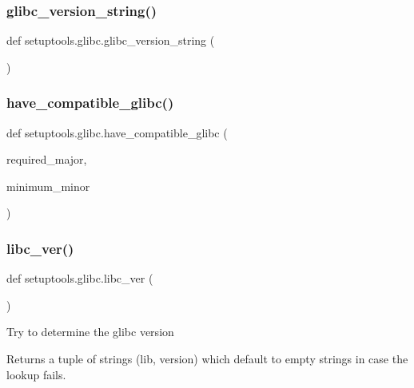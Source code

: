 \mbox{\label{namespacesetuptools_1_1glibc_a34f30251dcf219f515c161c578dd4b2a}} 
\subsubsection{\texorpdfstring{glibc\+\_\+version\+\_\+string()}{glibc\_version\_string()}}
{\footnotesize\ttfamily def setuptools.\+glibc.\+glibc\+\_\+version\+\_\+string (\begin{DoxyParamCaption}{ }\end{DoxyParamCaption})}

\mbox{\label{namespacesetuptools_1_1glibc_a9f9d4fc56791adef1e1f1f0a5ec2caff}} 
\subsubsection{\texorpdfstring{have\+\_\+compatible\+\_\+glibc()}{have\_compatible\_glibc()}}
{\footnotesize\ttfamily def setuptools.\+glibc.\+have\+\_\+compatible\+\_\+glibc (\begin{DoxyParamCaption}\item[{}]{required\+\_\+major,  }\item[{}]{minimum\+\_\+minor }\end{DoxyParamCaption})}

\mbox{\label{namespacesetuptools_1_1glibc_ae7bfd7d2e1286b0b63956da6501f1c96}} 
\subsubsection{\texorpdfstring{libc\+\_\+ver()}{libc\_ver()}}
{\footnotesize\ttfamily def setuptools.\+glibc.\+libc\+\_\+ver (\begin{DoxyParamCaption}{ }\end{DoxyParamCaption})}

\begin{DoxyVerb}Try to determine the glibc version

Returns a tuple of strings (lib, version) which default to empty strings
in case the lookup fails.
\end{DoxyVerb}
 